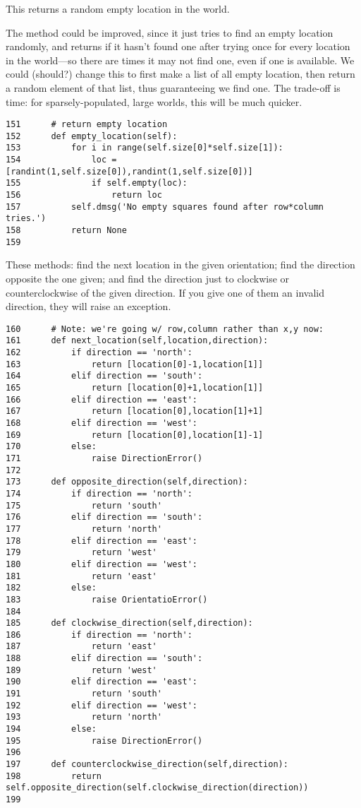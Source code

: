 \documentclass[11pt]{tufte-handout}
\begin{document}
This returns a random empty location in the world. 

The method could be improved, since it just tries to find an empty location randomly, and returns if it hasn't found one after trying once for every location in the world---so there are times it may not find one, even if one is available.  We could (should?) change this to first make a list of all empty location, then return a random element of that list, thus guaranteeing we find one.  The trade-off is time:  for sparsely-populated, large worlds, this will be much quicker.

\begin{verbatim}
151      # return empty location
152      def empty_location(self):
153          for i in range(self.size[0]*self.size[1]):
154              loc = [randint(1,self.size[0]),randint(1,self.size[0])]
155              if self.empty(loc):
156                  return loc
157          self.dmsg('No empty squares found after row*column tries.')
158          return None
159  
\end{verbatim}

These methods: find the next location in the given orientation; find the direction opposite the one given; and find the direction just to clockwise or counterclockwise of the given direction.  If you give one of them an invalid direction, they will raise an exception.

\begin{verbatim}
160      # Note: we're going w/ row,column rather than x,y now:
161      def next_location(self,location,direction):
162          if direction == 'north':
163              return [location[0]-1,location[1]]
164          elif direction == 'south':
165              return [location[0]+1,location[1]]
166          elif direction == 'east':
167              return [location[0],location[1]+1]            
168          elif direction == 'west':
169              return [location[0],location[1]-1]
170          else:
171              raise DirectionError()
172  
173      def opposite_direction(self,direction):
174          if direction == 'north':
175              return 'south'
176          elif direction == 'south':
177              return 'north'
178          elif direction == 'east':
179              return 'west'
180          elif direction == 'west':
181              return 'east'
182          else:
183              raise OrientatioError()
184  
185      def clockwise_direction(self,direction):
186          if direction == 'north':
187              return 'east'
188          elif direction == 'south':
189              return 'west'
190          elif direction == 'east':
191              return 'south'
192          elif direction == 'west':
193              return 'north'
194          else:
195              raise DirectionError()
196  
197      def counterclockwise_direction(self,direction):
198          return self.opposite_direction(self.clockwise_direction(direction))
199  
\end{verbatim}
\end{document}
